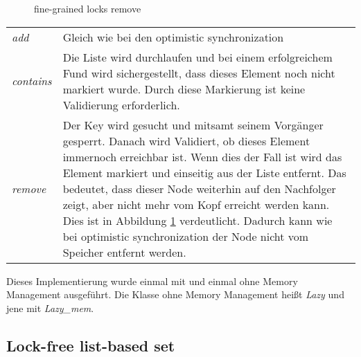 \begin{figure}[H]
	\centering
	\caption{fine-grained locks remove}
	\label{tik:fine-grained-remove}
\end{figure}

\begin{table}[H]
    \begin{tabularx}{\textwidth}{lX}
        \textit{add} & Gleich wie bei den optimistic synchronization\\
		\textit{contains} & Die Liste wird durchlaufen und bei einem erfolgreichem Fund wird sichergestellt, dass dieses Element noch nicht markiert wurde.
		Durch diese Markierung ist keine Validierung erforderlich. \\
		\textit{remove} & Der Key wird gesucht und mitsamt seinem Vorgänger gesperrt. Danach wird Validiert, ob dieses Element immernoch erreichbar ist. 
		Wenn dies der Fall ist wird das Element markiert und einseitig aus der Liste entfernt. Das bedeutet, dass dieser Node weiterhin auf den Nachfolger 
		zeigt, aber nicht mehr vom Kopf erreicht werden kann. Dies ist in Abbildung \ref{tik:fine-grained-remove} verdeutlicht. Dadurch kann wie bei
		optimistic synchronization der Node nicht vom Speicher entfernt werden.\\
    \end{tabularx}
\end{table}

Dieses Implementierung wurde einmal mit und einmal ohne Memory Management ausgeführt. Die Klasse ohne Memory Management heißt \textit{Lazy} und jene mit \textit{Lazy_mem}.

\subsection{Lock-free list-based set}

